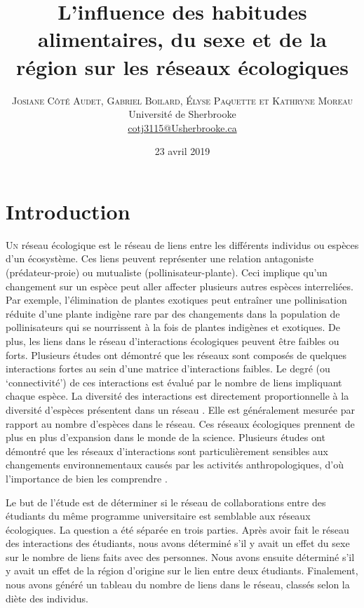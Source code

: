 \documentclass[twoside,twocolumn]{article}
\title{L'influence des habitudes alimentaires, du sexe et de la région sur les réseaux écologiques}
\author{
\textsc{Josiane Côté Audet, Gabriel Boilard, Élyse Paquette et Kathryne Moreau}\\ [1ex]
\normalsize Université de Sherbrooke\\
\normalsize \href{mailto:cotj3115@Usherbrooke.ca}{cotj3115@Usherbrooke.ca}
}
\date{23 avril 2019}
\begin{document}
\maketitle




\section{Introduction}

\lettrine[nindent=0em,lines=3]{U}
n réseau écologique est le réseau de liens entre les différents individus ou espèces d'un écosystème. Ces liens peuvent représenter une relation antagoniste (prédateur-proie) ou mutualiste (pollinisateur-plante). Ceci implique qu'un changement sur un espèce peut aller affecter plusieurs autres espèces interreliées. Par exemple, l'élimination de plantes exotiques peut entraîner une pollinisation réduite d'une plante indigène rare par des changements dans la population de pollinisateurs qui se nourrissent à la fois de plantes indigènes et exotiques. De plus, les liens dans le réseau d'interactions écologiques peuvent être faibles ou forts. Plusieurs études ont démontré que les réseaux sont composés de quelques interactions fortes au sein d'une matrice d'interactions faibles. Le degré (ou ‘connectivité') de ces interactions est évalué par le nombre de liens impliquant chaque espèce. La diversité des interactions est directement proportionnelle à la diversité d'espèces présentent dans un réseau \citep{tylianakis2010conservation}. Elle est généralement mesurée par rapport au nombre d'espèces dans le réseau.  Ces réseaux écologiques prennent de plus en plus d'expansion dans le monde de la science. Plusieurs études ont démontré que les réseaux d'interactions sont particulièrement sensibles aux changements environnementaux causés par les activités anthropologiques, d'où l'importance de bien les comprendre \citep{morris2010anthropogenic}.

Le but de l'étude est de déterminer si le réseau de collaborations entre des étudiants du même programme universitaire est semblable aux réseaux écologiques. La question a été séparée en trois parties. Après avoir fait le réseau des interactions des étudiants, nous avons déterminé s'il y avait un effet du sexe sur le nombre de liens faits avec des personnes. Nous avons ensuite déterminé s'il y avait un effet de la région d'origine sur le lien entre deux étudiants. Finalement, nous avons généré un tableau du nombre de liens dans le réseau, classés selon la diète des individus.
\end{document}
